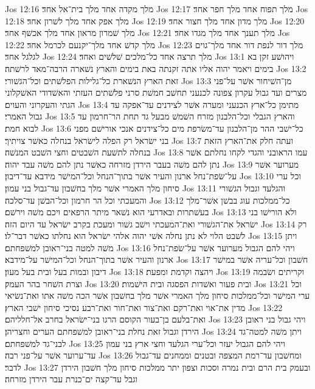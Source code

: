 Jos 12:16  מלך מקדה אחד מלך בית־אל אחד׃
Jos 12:17  מלך תפוח אחד מלך חפר אחד׃
Jos 12:18  מלך אפק אחד מלך לשׁרון אחד׃
Jos 12:19  מלך מדון אחד מלך חצור אחד׃
Jos 12:20  מלך שׁמרון מראון אחד מלך אכשׁף אחד׃
Jos 12:21  מלך תענך אחד מלך מגדו אחד׃
Jos 12:22  מלך קדשׁ אחד מלך־יקנעם לכרמל אחד׃
Jos 12:23  מלך דור לנפת דור אחד מלך־גוים לגלגל אחד׃
Jos 12:24  מלך תרצה אחד כל־מלכים שׁלשׁים ואחד׃
Jos 13:1  ויהושׁע זקן בא בימים ויאמר יהוה אליו אתה זקנתה באת בימים והארץ נשׁארה הרבה־מאד לרשׁתה׃
Jos 13:2  זאת הארץ הנשׁארת כל־גלילות הפלשׁתים וכל־הגשׁורי׃
Jos 13:3  מן־השׁיחור אשׁר על־פני מצרים ועד גבול עקרון צפונה לכנעני תחשׁב חמשׁת סרני פלשׁתים העזתי והאשׁדודי האשׁקלוני הגתי והעקרוני והעוים׃
Jos 13:4  מתימן כל־ארץ הכנעני ומערה אשׁר לצידנים עד־אפקה עד גבול האמרי׃
Jos 13:5  והארץ הגבלי וכל־הלבנון מזרח השׁמשׁ מבעל גד תחת הר־חרמון עד לבוא חמת׃
Jos 13:6  כל־ישׁבי ההר מן־הלבנון עד־משׂרפת מים כל־צידנים אנכי אורישׁם מפני בני ישׂראל רק הפלה לישׂראל בנחלה כאשׁר צויתיך׃
Jos 13:7  ועתה חלק את־הארץ הזאת בנחלה לתשׁעת השׁבטים וחצי השׁבט המנשׁה׃
Jos 13:8  עמו הראובני והגדי לקחו נחלתם אשׁר נתן להם משׁה בעבר הירדן מזרחה כאשׁר נתן להם משׁה עבד יהוה׃
Jos 13:9  מערוער אשׁר על־שׂפת־נחל ארנון והעיר אשׁר בתוך־הנחל וכל־המישׁר מידבא עד־דיבון׃
Jos 13:10  וכל ערי סיחון מלך האמרי אשׁר מלך בחשׁבון עד־גבול בני עמון׃
Jos 13:11  והגלעד וגבול הגשׁורי והמעכתי וכל הר חרמון וכל־הבשׁן עד־סלכה׃
Jos 13:12  כל־ממלכות עוג בבשׁן אשׁר־מלך בעשׁתרות ובאדרעי הוא נשׁאר מיתר הרפאים ויכם משׁה וירשׁם׃
Jos 13:13  ולא הורישׁו בני ישׂראל את־הגשׁורי ואת־המעכתי וישׁב גשׁור ומעכת בקרב ישׂראל עד היום הזה׃
Jos 13:14  רק לשׁבט הלוי לא נתן נחלה אשׁי יהוה אלהי ישׂראל הוא נחלתו כאשׁר דבר־לו׃
Jos 13:15  ויתן משׁה למטה בני־ראובן למשׁפחתם׃
Jos 13:16  ויהי להם הגבול מערוער אשׁר על־שׂפת־נחל ארנון והעיר אשׁר בתוך־הנחל וכל־המישׁר על־מידבא׃
Jos 13:17  חשׁבון וכל־עריה אשׁר במישׁר דיבון ובמות בעל ובית בעל מעון׃
Jos 13:18  ויהצה וקדמת ומפעת׃
Jos 13:19  וקריתים ושׂבמה וצרת השׁחר בהר העמק׃
Jos 13:20  ובית פעור ואשׁדות הפסגה ובית הישׁמות׃
Jos 13:21  וכל ערי המישׁר וכל־ממלכות סיחון מלך האמרי אשׁר מלך בחשׁבון אשׁר הכה משׁה אתו ואת־נשׂיאי מדין את־אוי ואת־רקם ואת־צור ואת־חור ואת־רבע נסיכי סיחון ישׁבי הארץ׃
Jos 13:22  ואת־בלעם בן־בעור הקוסם הרגו בני־ישׂראל בחרב אל־חלליהם׃
Jos 13:23  ויהי גבול בני ראובן הירדן וגבול זאת נחלת בני־ראובן למשׁפחתם הערים וחצריהן׃
Jos 13:24  ויתן משׁה למטה־גד לבני־גד למשׁפחתם׃
Jos 13:25  ויהי להם הגבול יעזר וכל־ערי הגלעד וחצי ארץ בני עמון עד־ערוער אשׁר על־פני רבה׃
Jos 13:26  ומחשׁבון עד־רמת המצפה ובטנים וממחנים עד־גבול לדבר׃
Jos 13:27  ובעמק בית הרם ובית נמרה וסכות וצפון יתר ממלכות סיחון מלך חשׁבון הירדן וגבל עד־קצה ים־כנרת עבר הירדן מזרחה׃
